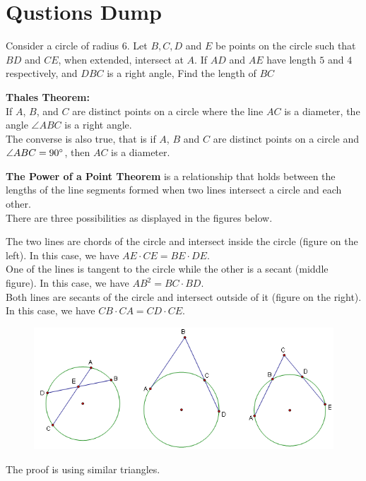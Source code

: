 \section{Qustions Dump}
\begin{G}
Consider a circle of radius $6$. Let $B,C,D$ and $E$ be points on the circle such that $BD$ and $CE$, when extended, intersect at $A$. If $AD$ and $AE$ have length $5$ and $4$ respectively, and $DBC$ is a right angle, Find the length of $BC$
\end{G}
\begin{idea}
\textbf{Thales Theorem:}\\
If $A$, $B$, and $C$ are distinct points on a circle where the line $AC$ is a diameter, the angle $\angle ABC$ is a right angle.\\
The converse is also true, that is if $A$, $B$ and $C$ are distinct points on a circle and $\angle ABC = 90^\circ$, then $AC$ is a diameter.\\
\end{idea}
\begin{idea}
\textbf{The Power of a Point Theorem} is a relationship that holds between the lengths of the line segments formed when two lines intersect a circle and each other.\\
There are three possibilities as displayed in the figures below.\\
\begin{itemize}
\ii The two lines are chords of the circle and intersect inside the circle (figure on the left). In this case, we have $AE\cdot CE = BE\cdot DE$.\\
\ii One of the lines is tangent to the circle while the other is a secant (middle figure). In this case, we have $AB^2 = BC\cdot BD$.\\
\ii Both lines are secants of the circle and intersect outside of it (figure on the right). In this case, we have $CB\cdot CA = CD\cdot CE.$\\
\end{itemize}
\begin{figure}[H]
    \centering
    \includegraphics[width=0.75\linewidth]{images/Power of Point.png}
\end{figure}
The proof is using similar triangles.\\
\end{idea}
